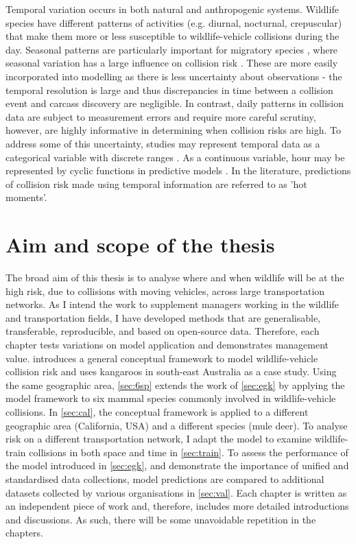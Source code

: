 Temporal variation occurs in both natural and anthropogenic systems. Wildlife species have different patterns of activities (e.g. diurnal, nocturnal, crepuscular) that make them more or less susceptible to wildlife-vehicle collisions during the day. Seasonal patterns are particularly important for migratory species \citep{hick85,bern92}, where seasonal variation has a large influence on collision risk \citep{}. These are more easily incorporated into modelling as there is less uncertainty about observations - the temporal resolution is large and thus discrepancies in time between a collision event and carcass discovery are negligible. In contrast, daily patterns in collision data are subject to measurement errors and require more careful scrutiny, however, are highly informative in determining when collision risks are high. To address some of this uncertainty, studies may represent temporal data as a categorical variable \citep{mizu14} with discrete ranges \citep{rowd08}. As a continuous variable, hour may be represented by cyclic functions in predictive models \citep{neum12}. In the literature, predictions of collision risk made using temporal information are referred to as 'hot moments'.

\section{Aim and scope of the thesis}

The broad aim of this thesis is to analyse where and when wildlife will be at the high risk, due to collisions with moving vehicles, across large transportation networks. As I intend the work to supplement managers working in the wildlife and transportation fields, I have developed methods that are generalisable, transferable, reproducible, and based on open-source data. Therefore, each chapter tests variations on model application and demonstrates management value.  introduces a general conceptual framework to model wildlife-vehicle collision risk and uses kangaroos in south-east Australia as a case study. Using the same geographic area, \cref{sec:6sp} extends the work of \cref{sec:egk} by applying the model framework to six mammal species commonly involved in wildlife-vehicle collisions. In \cref{sec:cal}, the conceptual framework is applied to a different geographic area (California, USA) and a different species (mule deer). To analyse risk on a different transportation network, I adapt the model to examine wildlife-train collisions in both space and time in \cref{sec:train}. To assess the performance of the model introduced in \cref{sec:egk}, and demonstrate the importance of unified and standardised data collections, model predictions are compared to additional datasets collected by various organisations in \cref{sec:val}. Each chapter is written as an independent piece of work and, therefore, includes more detailed introductions and discussions. As such, there will be some unavoidable repetition in the chapters.